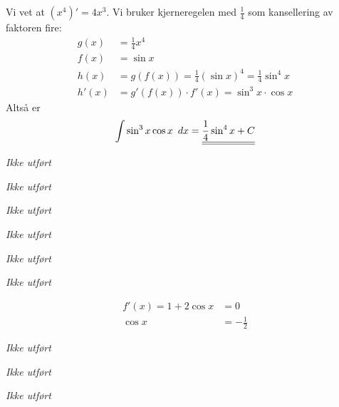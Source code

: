 \documentclass[a4paper,norsk,12pt]{article}
\begin{document}
Vi vet at $(x^4)' = 4x^3$. Vi bruker kjerneregelen med $\frac{1}{4}$ som
kansellering av faktoren fire:
\begin{align*}
  g(x) &= \frac{1}{4} x^4 \\
  f(x) &= \sin{x} \\
  h(x) &= g(f(x)) = \frac{1}{4}(\sin{x})^4 = \frac{1}{4} \sin^4{x} \\
  h'(x) &= g'(f(x)) \cdot f'(x) = \sin^3{x} \cdot \cos{x}
\end{align*}
Altså er
\begin{align*}
  \int \sin^3{x} \cos{x} \,dx = \svar{ \frac{1}{4} \sin^4{x} + C }
\end{align*}

\textit{Ikke utført}

\textit{Ikke utført}

\textit{Ikke utført}

\textit{Ikke utført}

\textit{Ikke utført}

\textit{Ikke utført}

\begin{align*}
  f'(x) = 1 + 2\cos{x} & = 0\\
  \cos{x} & = -\frac{1}{2}
\end{align*}

\textit{Ikke utført}

\textit{Ikke utført}

\textit{Ikke utført}
\end{document}
